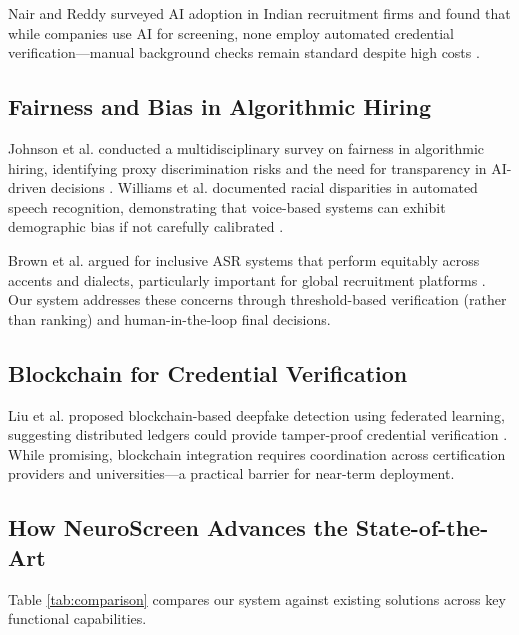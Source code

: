\documentclass[conference]{IEEEtran}
\begin{document}
Nair and Reddy surveyed AI adoption in Indian recruitment firms and found that while companies use AI for screening, none employ automated credential verification—manual background checks remain standard despite high costs \cite{nair2021recruitment}.

\subsection{Fairness and Bias in Algorithmic Hiring}

Johnson et al. conducted a multidisciplinary survey on fairness in algorithmic hiring, identifying proxy discrimination risks and the need for transparency in AI-driven decisions \cite{johnson2022fairness}. Williams et al. documented racial disparities in automated speech recognition, demonstrating that voice-based systems can exhibit demographic bias if not carefully calibrated \cite{williams2023racial}.

Brown et al. argued for inclusive ASR systems that perform equitably across accents and dialects, particularly important for global recruitment platforms \cite{brown2023inclusive}. Our system addresses these concerns through threshold-based verification (rather than ranking) and human-in-the-loop final decisions.

\subsection{Blockchain for Credential Verification}

Liu et al. proposed blockchain-based deepfake detection using federated learning, suggesting distributed ledgers could provide tamper-proof credential verification \cite{liu2022blockchain}. While promising, blockchain integration requires coordination across certification providers and universities—a practical barrier for near-term deployment.

\subsection{How NeuroScreen Advances the State-of-the-Art}

Table \ref{tab:comparison} compares our system against existing solutions across key functional capabilities.
\end{document}
